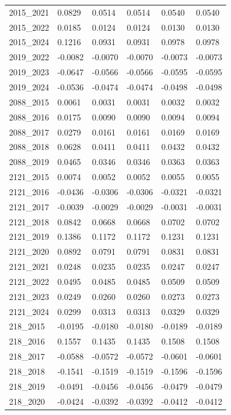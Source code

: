 \begin{table}[htbp]
\begin{tabular}{llllll}
2015_2021 & 0.0829 & 0.0514 & 0.0514 & 0.0540 & 0.0540 \\
2015_2022 & 0.0185 & 0.0124 & 0.0124 & 0.0130 & 0.0130 \\
2015_2024 & 0.1216 & 0.0931 & 0.0931 & 0.0978 & 0.0978 \\
2019_2022 & -0.0082 & -0.0070 & -0.0070 & -0.0073 & -0.0073 \\
2019_2023 & -0.0647 & -0.0566 & -0.0566 & -0.0595 & -0.0595 \\
2019_2024 & -0.0536 & -0.0474 & -0.0474 & -0.0498 & -0.0498 \\
2088_2015 & 0.0061 & 0.0031 & 0.0031 & 0.0032 & 0.0032 \\
2088_2016 & 0.0175 & 0.0090 & 0.0090 & 0.0094 & 0.0094 \\
2088_2017 & 0.0279 & 0.0161 & 0.0161 & 0.0169 & 0.0169 \\
2088_2018 & 0.0628 & 0.0411 & 0.0411 & 0.0432 & 0.0432 \\
2088_2019 & 0.0465 & 0.0346 & 0.0346 & 0.0363 & 0.0363 \\
2121_2015 & 0.0074 & 0.0052 & 0.0052 & 0.0055 & 0.0055 \\
2121_2016 & -0.0436 & -0.0306 & -0.0306 & -0.0321 & -0.0321 \\
2121_2017 & -0.0039 & -0.0029 & -0.0029 & -0.0031 & -0.0031 \\
2121_2018 & 0.0842 & 0.0668 & 0.0668 & 0.0702 & 0.0702 \\
2121_2019 & 0.1386 & 0.1172 & 0.1172 & 0.1231 & 0.1231 \\
2121_2020 & 0.0892 & 0.0791 & 0.0791 & 0.0831 & 0.0831 \\
2121_2021 & 0.0248 & 0.0235 & 0.0235 & 0.0247 & 0.0247 \\
2121_2022 & 0.0495 & 0.0485 & 0.0485 & 0.0509 & 0.0509 \\
2121_2023 & 0.0249 & 0.0260 & 0.0260 & 0.0273 & 0.0273 \\
2121_2024 & 0.0299 & 0.0313 & 0.0313 & 0.0329 & 0.0329 \\
218_2015 & -0.0195 & -0.0180 & -0.0180 & -0.0189 & -0.0189 \\
218_2016 & 0.1557 & 0.1435 & 0.1435 & 0.1508 & 0.1508 \\
218_2017 & -0.0588 & -0.0572 & -0.0572 & -0.0601 & -0.0601 \\
218_2018 & -0.1541 & -0.1519 & -0.1519 & -0.1596 & -0.1596 \\
218_2019 & -0.0491 & -0.0456 & -0.0456 & -0.0479 & -0.0479 \\
218_2020 & -0.0424 & -0.0392 & -0.0392 & -0.0412 & -0.0412 \\

\end{tabular}
\end{table}
